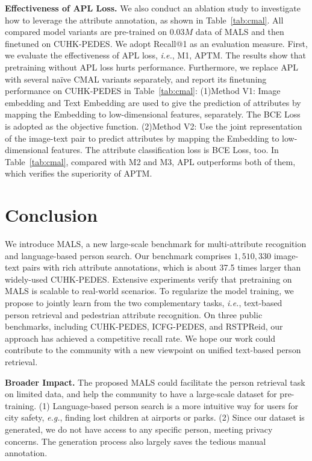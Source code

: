 \documentclass[sigconf]{acmart}
\def\eg{\emph{e.g.}}
\def\ie{\emph{i.e.}}
\begin{document}
\noindent\textbf{Effectiveness of APL Loss.} 
We also conduct an ablation study to investigate how to leverage the attribute annotation, as shown in Table~\ref{tab:cmal}. 
All compared model variants are pre-trained on $0.03M$ data of MALS and then finetuned on CUHK-PEDES.
We adopt Recall@1 as an evaluation measure.
First, we evaluate the effectiveness of APL loss, \ie, M1, APTM. 
The results show that pretraining without APL loss hurts performance.
Furthermore, we replace APL with several naïve CMAL variants separately, and report its finetuning performance on CUHK-PEDES in Table~\ref{tab:cmal}:
(1)Method V1: Image embedding and Text Embedding are used to give the prediction of attributes by mapping the Embedding to low-dimensional features, separately. The BCE Loss is adopted as the objective function.
(2)Method V2: Use the joint representation of the image-text pair to predict attributes by mapping the Embedding to low-dimensional features. The attribute classification loss is BCE Loss, too. 
In Table~\ref{tab:cmal}, compared with M2 and M3, APL
outperforms both of them, which verifies the superiority of APTM.


\section{Conclusion}
We introduce MALS, a new large-scale benchmark for multi-attribute recognition and language-based person search. Our benchmark comprises $1,510,330$ image-text pairs with rich attribute annotations, which is about 37.5 times larger than widely-used CUHK-PEDES. Extensive experiments verify that pretraining on MALS is scalable to real-world scenarios. To regularize the model training, we propose to jointly learn from the two complementary tasks, \ie, text-based person retrieval and pedestrian attribute recognition.
On three public benchmarks, including CUHK-PEDES, ICFG-PEDES, and RSTPReid, our approach has achieved a competitive recall rate.
We hope our work could contribute to the community with a new viewpoint on unified text-based person retrieval.  


\noindent\textbf{Broader Impact.}
The proposed MALS could facilitate the person retrieval task on limited data, and help the community to have a large-scale dataset for pre-training. 
(1) Language-based person search is a more intuitive way for users for city safety, \eg, finding lost children at airports or parks.
(2) Since our dataset is generated, we do not have access to any specific person, meeting privacy concerns. The generation process also largely saves the tedious manual annotation. 
\end{document}
